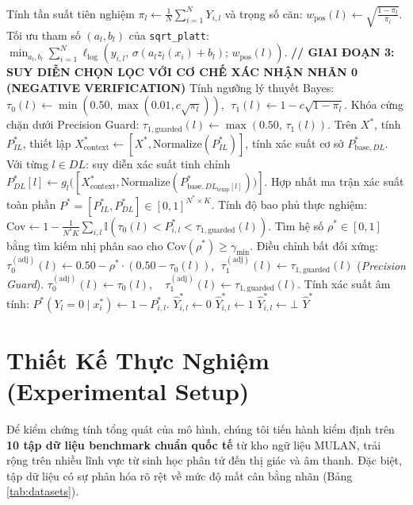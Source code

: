 \documentclass[10pt,a4paper,twoside]{article}
\begin{document}
\begin{algorithm}[H]
\begin{algorithmic}[1]
    \State Tính tần suất tiên nghiệm $\pi_l \gets \frac{1}{N} \sum_{i=1}^N Y_{i, l}$ và trọng số căn: $w_{\text{pos}}(l) \gets \sqrt{\frac{1 - \pi_l}{\pi_l}}$.
    \State Tối ưu tham số $(a_l, b_l)$ của \texttt{sqrt\_platt}: $\min_{a_l, b_l} \sum_{i=1}^N \ell_{\text{log}}\left(y_{i, l}, \, \sigma(a_l z_l(x_i) + b_l); \, w_{\text{pos}}(l)\right)$.
\EndFor
\Statex \textbf{// GIAI ĐOẠN 3: SUY DIỄN CHỌN LỌC VỚI CƠ CHẾ XÁC NHẬN NHÃN 0 (NEGATIVE VERIFICATION)}
\State Tính ngưỡng lý thuyết Bayes: $\tau_0(l) \gets \min(0.50, \max(0.01, c\sqrt{\pi_l}))$, $\; \tau_1(l) \gets 1 - c\sqrt{1-\pi_l}$.
\State Khóa cứng chặn dưới Precision Guard: $\tau_{1, \text{guarded}}(l) \gets \max(0.50, \, \tau_1(l))$.
\State Trên $X^*$, tính $P^*_{IL}$, thiết lập $X^*_{\text{context}} \gets [X^*, \text{Normalize}(P^*_{IL})]$, tính xác suất cơ sở $P^*_{\text{base}, DL}$.
\State Với từng $l \in DL$: suy diễn xác suất tinh chỉnh $P^*_{DL}[l] \gets g_l([X^*_{\text{context}}, \text{Normalize}(P^*_{\text{base}, DL_{\text{temp}}[l]}))]$.
\State Hợp nhất ma trận xác suất toàn phần $P^* = [P^*_{IL}, P^*_{DL}] \in [0, 1]^{N^* \times K}$.
\State Tính độ bao phủ thực nghiệm: $\text{Cov} \gets 1 - \frac{1}{N^* K} \sum_{i, l} \mathbb{I}(\tau_0(l) < P^*_{i, l} < \tau_{1, \text{guarded}}(l))$.
    \State Tìm hệ số $\rho^* \in [0, 1]$ bằng tìm kiếm nhị phân sao cho $\text{Cov}(\rho^*) \ge \gamma_{\min}$.
    \State Điều chỉnh bất đối xứng: $\tau_0^{(\text{adj})}(l) \gets 0.50 - \rho^* \cdot (0.50 - \tau_0(l))$, $\; \tau_1^{(\text{adj})}(l) \gets \tau_{1, \text{guarded}}(l)$ (\textit{Precision Guard}).
\Else
    \State $\tau_0^{(\text{adj})}(l) \gets \tau_0(l), \quad \tau_1^{(\text{adj})}(l) \gets \tau_{1, \text{guarded}}(l)$.
\EndIf
{}
    \State Tính xác suất âm tính: $P^*(Y_l = 0 \mid x_i^*) \gets 1 - P^*_{i, l}$.
     
        \State $\hat{Y}^*_{i, l} \gets 0$
     
        \State $\hat{Y}^*_{i, l} \gets 1$
    \Else {}
        \State $\hat{Y}^*_{i, l} \gets \bot$
    \EndIf
\EndFor
\State \Return $\hat{Y}^*$
\end{algorithmic}
\end{algorithm}

\section{Thiết Kế Thực Nghiệm (Experimental Setup)}
Để kiểm chứng tính tổng quát của mô hình, chúng tôi tiến hành kiểm định trên \textbf{10 tập dữ liệu benchmark chuẩn quốc tế} từ kho ngữ liệu MULAN, trải rộng trên nhiều lĩnh vực từ sinh học phân tử đến thị giác và âm thanh. Đặc biệt, tập dữ liệu có sự phân hóa rõ rệt về mức độ mất cân bằng nhãn (Bảng \ref{tab:datasets}).
\end{document}
